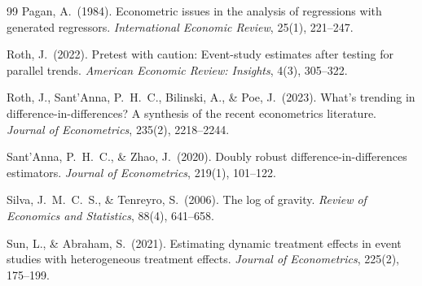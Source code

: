 \documentclass[12pt, a4paper]{article}
\begin{document}
\begin{thebibliography}{99}
 Pagan, A.\ (1984). Econometric issues in the analysis of regressions with generated regressors. \textit{International Economic Review}, 25(1), 221--247.

 Roth, J.\ (2022). Pretest with caution: Event-study estimates after testing for parallel trends. \textit{American Economic Review: Insights}, 4(3), 305--322.

 Roth, J., Sant'Anna, P.\ H.\ C., Bilinski, A., \& Poe, J.\ (2023). What's trending in difference-in-differences? A synthesis of the recent econometrics literature. \textit{Journal of Econometrics}, 235(2), 2218--2244.

 Sant'Anna, P.\ H.\ C., \& Zhao, J.\ (2020). Doubly robust difference-in-differences estimators. \textit{Journal of Econometrics}, 219(1), 101--122.

 Silva, J.\ M.\ C.\ S., \& Tenreyro, S.\ (2006). The log of gravity. \textit{Review of Economics and Statistics}, 88(4), 641--658.

 Sun, L., \& Abraham, S.\ (2021). Estimating dynamic treatment effects in event studies with heterogeneous treatment effects. \textit{Journal of Econometrics}, 225(2), 175--199.

\end{thebibliography}
\end{document}
